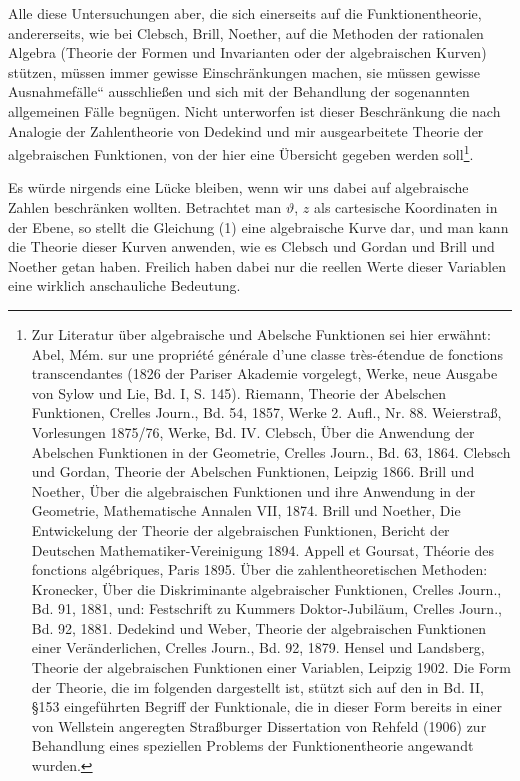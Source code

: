 \documentclass[12pt,a4paper]{article}
\theoremstyle{definition}
\begin{document}
Alle diese Untersuchungen aber, die sich einerseits auf die Funktionentheorie, andererseits, wie bei Clebsch, Brill, Noether, auf die Methoden der rationalen Algebra (Theorie der Formen und Invarianten oder der algebraischen Kurven) stützen, müssen immer gewisse Einschränkungen machen, sie müssen gewisse \glqq Ausnahmefälle`` ausschließen und sich mit der Behandlung der sogenannten allgemeinen Fälle begnügen. Nicht unterworfen ist dieser Beschränkung die nach Analogie der Zahlentheorie von Dedekind und mir ausgearbeitete Theorie der algebraischen Funktionen, von der hier eine Übersicht gegeben werden soll\footnote{Zur Literatur über algebraische und Abelsche Funktionen sei hier erwähnt: Abel, Mém. sur une propriété générale d'une classe très-étendue de fonctions transcendantes (1826 der Pariser Akademie vorgelegt, Werke, neue Ausgabe von Sylow und Lie, Bd. I, S. 145). Riemann, Theorie der Abelschen Funktionen, Crelles Journ., Bd. 54, 1857, Werke 2. Aufl., Nr. 88. Weierstraß, Vorlesungen 1875/76, Werke, Bd. IV. Clebsch, Über die Anwendung der Abelschen Funktionen in der Geometrie, Crelles Journ., Bd. 63, 1864. Clebsch und Gordan, Theorie der Abelschen Funktionen, Leipzig 1866. Brill und Noether, Über die algebraischen Funktionen und ihre Anwendung in der Geometrie, Mathematische Annalen VII, 1874. Brill und Noether, Die Entwickelung der Theorie der algebraischen Funktionen, Bericht der Deutschen Mathematiker-Vereinigung 1894. Appell et Goursat, Théorie des fonctions algébriques, Paris 1895. Über die zahlentheoretischen Methoden: Kronecker, Über die Diskriminante algebraischer Funktionen, Crelles Journ., Bd. 91, 1881, und: Festschrift zu Kummers Doktor-Jubiläum, Crelles Journ., Bd. 92, 1881. Dedekind und Weber, Theorie der algebraischen Funktionen einer Veränderlichen, Crelles Journ., Bd. 92, 1879. Hensel und Landsberg, Theorie der algebraischen Funktionen einer Variablen, Leipzig 1902. Die Form der Theorie, die im folgenden dargestellt ist, stützt sich auf den in Bd. II, \S 153 eingeführten Begriff der Funktionale, die in dieser Form bereits in einer von Wellstein angeregten Straßburger Dissertation von Rehfeld (1906) zur Behandlung eines speziellen Problems der Funktionentheorie angewandt wurden.}.

Es würde nirgends eine Lücke bleiben, wenn wir uns dabei auf algebraische Zahlen beschränken wollten. Betrachtet man $\vartheta$, $z$ als cartesische Koordinaten in der Ebene, so stellt die Gleichung (1) eine algebraische Kurve dar, und man kann die Theorie dieser Kurven anwenden, wie es Clebsch und Gordan und Brill und Noether getan haben. Freilich haben dabei nur die reellen Werte dieser Variablen eine wirklich anschauliche Bedeutung.
\end{document}
